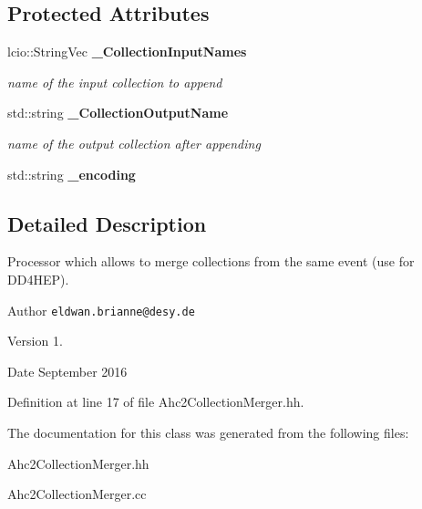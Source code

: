 \subsection*{Protected Attributes}
\begin{DoxyCompactItemize}
\item 
lcio\-::\-String\-Vec {\bf \-\_\-\-Collection\-Input\-Names}\label{classCALICE_1_1Ahc2CollectionMerger_aa915f7a73842f950b1024bd4febf15fc}

\begin{DoxyCompactList}\small\item\em name of the input collection to append \end{DoxyCompactList}\item 
std\-::string {\bf \-\_\-\-Collection\-Output\-Name}\label{classCALICE_1_1Ahc2CollectionMerger_a1078419aa8e347575549cf1036ae58b7}

\begin{DoxyCompactList}\small\item\em name of the output collection after appending \end{DoxyCompactList}\item 
std\-::string {\bfseries \-\_\-encoding}\label{classCALICE_1_1Ahc2CollectionMerger_a92ea968b43e51fe59f49da396bfa62e2}

\end{DoxyCompactItemize}


\subsection{Detailed Description}
Processor which allows to merge collections from the same event (use for D\-D4\-H\-E\-P). 

\begin{DoxyAuthor}{Author}
{\tt eldwan.\-brianne@desy.\-de} 
\end{DoxyAuthor}
\begin{DoxyVersion}{Version}
1. 
\end{DoxyVersion}
\begin{DoxyDate}{Date}
September 2016 
\end{DoxyDate}


Definition at line 17 of file Ahc2\-Collection\-Merger.\-hh.



The documentation for this class was generated from the following files\-:\begin{DoxyCompactItemize}
\item 
Ahc2\-Collection\-Merger.\-hh\item 
Ahc2\-Collection\-Merger.\-cc\end{DoxyCompactItemize}
